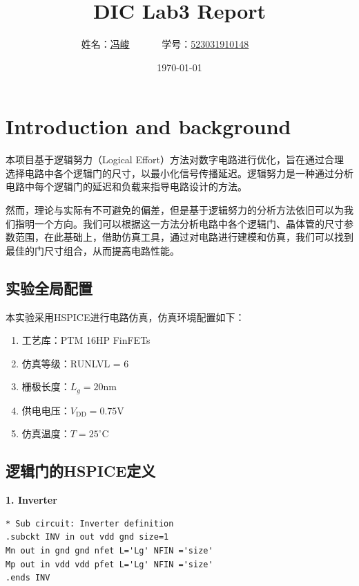 \documentclass[UTF8,12pt,a4paper]{ctexart}
\title{DIC Lab3 Report}
\author{
	姓名：\underline{冯峻}~~~~~~
	学号：\underline{523031910148}~~~~~~}
\date{\today}
\begin{document}
\fancyfoot[C]{\thepage}

\maketitle

\section{Introduction and background}
本项目基于逻辑努力（Logical Effort）方法对数字电路进行优化，旨在通过合理选择电路中各个逻辑门的尺寸，以最小化信号传播延迟。逻辑努力是一种通过分析电路中每个逻辑门的延迟和负载来指导电路设计的方法。

然而，理论与实际有不可避免的偏差，但是基于逻辑努力的分析方法依旧可以为我们指明一个方向。我们可以根据这一方法分析电路中各个逻辑门、晶体管的尺寸参数范围，在此基础上，借助仿真工具，通过对电路进行建模和仿真，我们可以找到最佳的门尺寸组合，从而提高电路性能。

\subsection{实验全局配置}
本实验采用HSPICE进行电路仿真，仿真环境配置如下：

\begin{enumerate}
    \item 工艺库：PTM 16HP FinFETs
    \item 仿真等级：RUNLVL = 6
    \item 栅极长度：$L_g = 20$nm
    \item 供电电压：$V_{\text{DD}} = 0.75$V
    \item 仿真温度：$T = 25^\circ\mathrm{C}$
\end{enumerate}

\subsection{逻辑门的HSPICE定义}
\textbf{1. Inverter}
\begin{lstlisting}
* Sub circuit: Inverter definition
.subckt INV in out vdd gnd size=1
Mn out in gnd gnd nfet L='Lg' NFIN ='size'
Mp out in vdd vdd pfet L='Lg' NFIN ='size'
.ends INV
\end{lstlisting}
\end{document}

